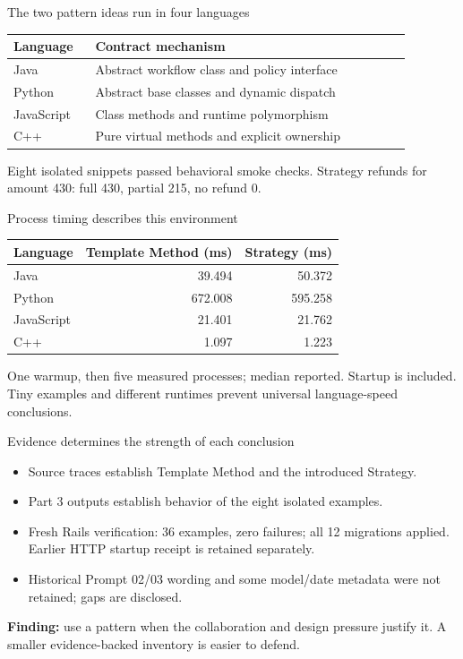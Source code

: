 \documentclass[aspectratio=169,11pt]{beamer}
\begin{document}
\begin{frame}{The two pattern ideas run in four languages}
\begin{tabular}{L{0.18\linewidth}L{0.70\linewidth}}
\toprule Language & Contract mechanism\\\midrule
Java & Abstract workflow class and policy interface\\[0.14cm]
Python & Abstract base classes and dynamic dispatch\\[0.14cm]
JavaScript & Class methods and runtime polymorphism\\[0.14cm]
C++ & Pure virtual methods and explicit ownership\\\bottomrule
\end{tabular}\par
\vspace{0.35cm}
Eight isolated snippets passed behavioral smoke checks. Strategy refunds for amount 430: full 430, partial 215, no refund 0.
\end{frame}
\begin{frame}{Process timing describes this environment}
\centering
\begin{tabular}{lrr}
\toprule Language & Template Method (ms) & Strategy (ms)\\\midrule
Java & 39.494 & 50.372\\
Python & 672.008 & 595.258\\
JavaScript & 21.401 & 21.762\\
C++ & 1.097 & 1.223\\\bottomrule
\end{tabular}\par
\vspace{0.4cm}\raggedright
One warmup, then five measured processes; median reported. Startup is included. Tiny examples and different runtimes prevent universal language-speed conclusions.
\end{frame}
\begin{frame}{Evidence determines the strength of each conclusion}
\begin{itemize}
\item Source traces establish Template Method and the introduced Strategy.
\item Part 3 outputs establish behavior of the eight isolated examples.
\item Fresh Rails verification: 36 examples, zero failures; all 12 migrations applied. Earlier HTTP startup receipt is retained separately.
\item Historical Prompt 02/03 wording and some model/date metadata were not retained; gaps are disclosed.
\end{itemize}
\vspace{0.3cm}
\textbf{Finding:} use a pattern when the collaboration and design pressure justify it. A smaller evidence-backed inventory is easier to defend.
\end{frame}
\end{document}
